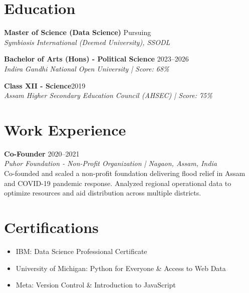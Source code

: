 \documentclass[10pt, a4paper]{article}
\begin{document}
	
	
	\section{Education}
	\noindent\textbf{Master of Science (Data Science)} \hfill Pursuing\\
	\textit{Symbiosis International (Deemed University), SSODL} \vspace{0.5em}
	
	\noindent\textbf{Bachelor of Arts (Hons) - Political Science} \hfill 2023--2026\\
	\textit{Indira Gandhi National Open University | Score: 68\%} \vspace{0.5em}
	
	\noindent\textbf{Class XII - Science}\hfill 2019\\
	\textit{Assam Higher Secondary Education Council (AHSEC) | Score: 75\%} \vspace{0.5em}
	
	
	
	\section{Work Experience}
	\noindent\textbf{Co-Founder} \hfill 2020--2021\\
	\textit{Puhor Foundation - Non-Profit Organization | Nagaon, Assam, India}\\
	Co-founded and scaled a non-profit foundation delivering flood relief in Assam and COVID-19 pandemic response. Analyzed regional operational data to optimize resources and aid distribution across multiple districts.
	
	
	
	\section{Certifications}
	\begin{itemize}[leftmargin=0.15in, topsep=2pt, partopsep=0pt, parsep=0pt, itemsep=2pt, label=\textbullet]
		\item IBM: Data Science Professional Certificate
		\item University of Michigan: Python for Everyone \& Access to Web Data
		\item Meta: Version Control \& Introduction to JavaScript
	\end{itemize}
	
\end{document}

